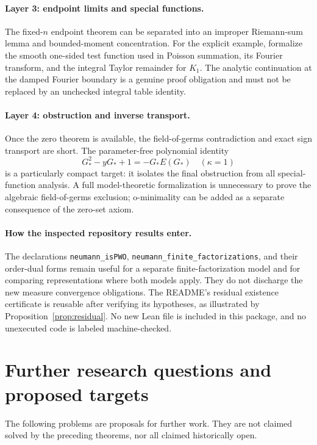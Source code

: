 \documentclass[11pt,a4paper]{article}
\theoremstyle{definition}
\theoremstyle{remark}
\newcommand{\code}[1]{\nolinkurl{#1}}
\numberwithin{equation}{section}
\begin{document}
\paragraph{Layer 3: endpoint limits and special functions.}
The fixed-$n$ endpoint theorem can be separated into an improper Riemann-sum lemma and bounded-moment concentration. For the explicit example, formalize the smooth one-sided test function used in Poisson summation, its Fourier transform, and the integral Taylor remainder for $K_1$. The analytic continuation at the damped Fourier boundary is a genuine proof obligation and must not be replaced by an unchecked integral table identity.

\paragraph{Layer 4: obstruction and inverse transport.}
Once the zero theorem is available, the field-of-germs contradiction and exact sign transport are short. The parameter-free polynomial identity
\[
 G_*^2-yG_*+1=-G_*E(G_*)\quad(\kappa=1)
\]
is a particularly compact target: it isolates the final obstruction from all special-function analysis. A full model-theoretic formalization is unnecessary to prove the algebraic field-of-germs exclusion; o-minimality can be added as a separate consequence of the zero-set axiom.

\paragraph{How the inspected repository results enter.}
The declarations \code{neumann_isPWO}, \code{neumann_finite_factorizations}, and their order-dual forms \cite{repo-neumann} remain useful for a separate finite-factorization model and for comparing representations where both models apply. They do not discharge the new measure convergence obligations. The README's residual existence certificate is reusable after verifying its hypotheses, as illustrated by Proposition~\ref{prop:residual}. No new Lean file is included in this package, and no unexecuted code is labeled machine-checked.

\section{Further research questions and proposed targets}\label{sec:future}
The following problems are proposals for further work. They are not claimed solved by the preceding theorems, nor all claimed historically open.
\end{document}
